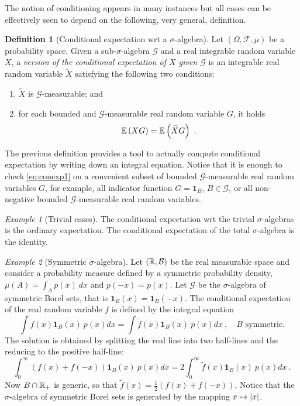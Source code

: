 \documentclass[12pt,a4paper]{amsart}
\newcommand{\one}{\bm 1}
\theoremstyle{plain}%
\theoremstyle{definition}
\newtheorem{definition}{Definition}%
\theoremstyle{remark}
\newtheorem{example}{Example}
\begin{document}
The notion of conditioning appears in many instances but all cases can
be effectively seen to depend on the following, very general,
definition.

\begin{definition}[Conditional expectation wrt a $\sigma$-algebra]\label{def:condexp1}
  Let $(\Omega,\mathcal F,\mu)$ be a probability space. Given a
  sub-$\sigma$-algebra $\mathcal G$ and a real integrable random
  variable $X$, a \emph{version of the conditional expectation of $X$
    given $\mathcal G$} is an integrable real random variable
  $\widetilde X$ satisfying the following two conditions:
\begin{enumerate}
\item $\widetilde X$ is $\mathcal G$-measurable; and
\item for each bounded and $\mathcal G$-measurable real random variable
  $G$, it holds
  \begin{equation}\label{eq:conexp1}
    \operatorname{\mathbb E}\left(XG\right) = \operatorname{\mathbb E}\left(\widetilde X G\right) \ .
  \end{equation}
\end{enumerate}
\end{definition}

The previous definition provides a tool to actually compute
conditional expectation by writing down an integral equation. Notice
that it is enough to check \cref{eq:conexp1} on a convenient subset of
bounded $\mathcal G$-measurable real random variables $G$, for
example, all indicator function $G=\one_B$, $B \in \mathcal G$, or all
non-negative bounded $\mathcal G$-measurable real random variables.

\begin{example}[Trivial cases] The conditional expectation wrt the
  trivial $\sigma$-algebras is the ordinary expectation. The
  conditional expectation of the total $\sigma$-algebra is the identity.
  
\end{example}
\begin{example}[Symmetric $\sigma$-algebra]
  Let $(\mathbb{R},\mathcal B)$ be the real measurable space and consider a
  probability measure defined by a symmetric probability density,
  $\mu(A) = \int_A p(x) \ dx$ and $p(-x) = p(x)$. Let $\mathcal G$ be the
  $\sigma$-algebra of symmetric Borel sets, that is $\one_B(x) =
  \one_B(-x)$. The conditional expectation of the real random variable
  $f$ is defined by the integral equation
  \begin{equation*}
    \int f(x)\one_B(x) \ p(x)dx = \int \tilde f(x) \one_B(x) \ p(x)dx
    \ , \quad \text{$B$ symmetric.} 
  \end{equation*}
The solution is obtained by splitting the real line into two
half-lines and the reducing to the positive half-line:
\begin{equation*}
  \int_0^\infty (f(x)+f(-x)) \one_B(x) \ p(x)dx = 2 \int_0^\infty
  \tilde f(x) \one_B(x) \ p(x)dx \ .
\end{equation*}
Now $B \cap \mathbb{R}_+$ is generic, so that $\tilde f(x) = \frac12 (f(x)
+ f(-x))$. Notice that the $\sigma$-algebra of symmetric Borel sets is
generated by the mapping $x \mapsto \left\vert x\right\vert$.
\end{example}
\end{document}
